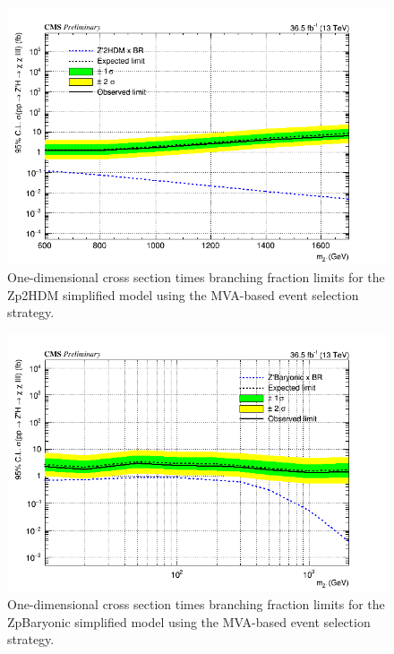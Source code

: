 \begin{figure}[tbh]
\centering
\includegraphics[width=6in]{figures/sigma_limits_4mu_Zp2HDM_MVA.png}
\caption{One-dimensional cross section times branching fraction limits for the Zp2HDM simplified model using the MVA-based event selection strategy.}
\label{fig:limzp2hdmmva}
\end{figure}

\begin{figure}[tbh]
\centering
\includegraphics[width=6in]{figures/sigma_limits_4mu_ZpBaryonic_MVA.png}
\caption{One-dimensional cross section times branching fraction limits for the ZpBaryonic simplified model using the MVA-based event selection strategy.}
\label{fig:limzpbaryonicmva}
\end{figure}


